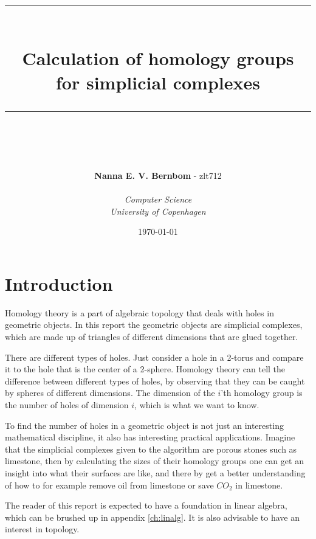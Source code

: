 \documentclass[11pt,a4paper,twoside]{report}
\newcommand{\HRule}{\rule{\linewidth}{0.5mm}}
\begin{document}
\lstset{language=python,frame=single,breaklines=true, title=\lstname}

\begin{titlepage}
\title{\HRule \\[0.4cm]
\textbf{Calculation of homology groups\\for simplicial complexes}\\
\HRule \\[0.4cm]}
\author{\textbf{Nanna E. V. Bernbom} - zlt712\\\\
\textit{Computer Science}\\
\textit{University of Copenhagen}}
\date{\today}

\maketitle
\thispagestyle{empty}
\end{titlepage}
\newpage


\tableofcontents
\newpage
\section*{Introduction}
Homology theory is a part of algebraic topology that deals with holes in geometric objects. In this report the geometric objects are simplicial complexes, which are made up of triangles of different dimensions that are glued together.

There are different types of holes. Just consider a hole in a 2-torus and compare it to the hole that is the center of a 2-sphere. Homology theory can tell the difference between different types of holes, by observing that they can be caught by spheres of different dimensions. The dimension of the $i$'th homology group is the number of holes of dimension $i$, which is what we want to know.

To find the number of holes in a geometric object is not just an interesting mathematical discipline, it also has interesting practical applications. Imagine that the simplicial complexes given to the algorithm are porous stones such as limestone, then by calculating the sizes of their homology groups one can get an insight into what their surfaces are like, and there by get a better understanding of how to for example remove oil from limestone or save $CO_2$ in limestone. 

The reader of this report is expected to have a foundation in linear algebra, which can be brushed up in appendix \ref{ch:linalg}. It is also advisable to have an interest in topology.
\end{document}

